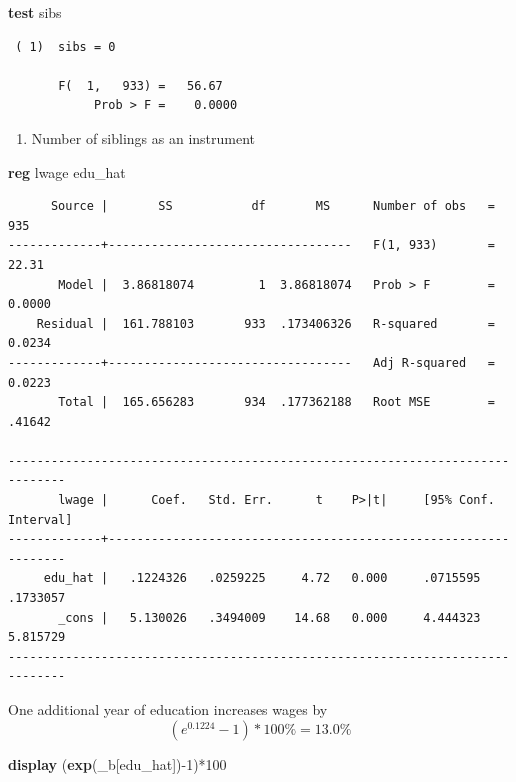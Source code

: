 \documentclass[
]{book}
\newenvironment{Shaded}{\begin{snugshade}}{\end{snugshade}}
\newcommand{\FunctionTok}[1]{\textcolor[rgb]{0.13,0.29,0.53}{\textbf{#1}}}
\newcommand{\KeywordTok}[1]{\textcolor[rgb]{0.13,0.29,0.53}{\textbf{#1}}}
\newcommand{\NormalTok}[1]{#1}
\providecommand{\tightlist}{%
  \setlength{\itemsep}{0pt}\setlength{\parskip}{0pt}}
\begin{document}
\begin{Shaded}
\begin{Highlighting}[]
\KeywordTok{test}\NormalTok{ sibs}
\end{Highlighting}
\end{Shaded}

\begin{verbatim}
 ( 1)  sibs = 0

       F(  1,   933) =   56.67
            Prob > F =    0.0000
\end{verbatim}

\begin{enumerate}
\def\labelenumi{\arabic{enumi})}
\setcounter{enumi}{3}
\tightlist
\item
  Number of siblings as an instrument
\end{enumerate}

\begin{Shaded}
\begin{Highlighting}[]
\KeywordTok{reg}\NormalTok{ lwage edu\_hat}
\end{Highlighting}
\end{Shaded}

\begin{verbatim}
      Source |       SS           df       MS      Number of obs   =       935
-------------+----------------------------------   F(1, 933)       =     22.31
       Model |  3.86818074         1  3.86818074   Prob > F        =    0.0000
    Residual |  161.788103       933  .173406326   R-squared       =    0.0234
-------------+----------------------------------   Adj R-squared   =    0.0223
       Total |  165.656283       934  .177362188   Root MSE        =    .41642

------------------------------------------------------------------------------
       lwage |      Coef.   Std. Err.      t    P>|t|     [95% Conf. Interval]
-------------+----------------------------------------------------------------
     edu_hat |   .1224326   .0259225     4.72   0.000     .0715595    .1733057
       _cons |   5.130026   .3494009    14.68   0.000     4.444323    5.815729
------------------------------------------------------------------------------
\end{verbatim}

One additional year of education increases wages by \[ (e^{0.1224}-1)*100\% =13.0\% \]

\begin{Shaded}
\begin{Highlighting}[]
\KeywordTok{display}\NormalTok{ (}\FunctionTok{exp}\NormalTok{(\_b[edu\_hat]){-}1)*100 }
\end{Highlighting}
\end{Shaded}
\end{document}
